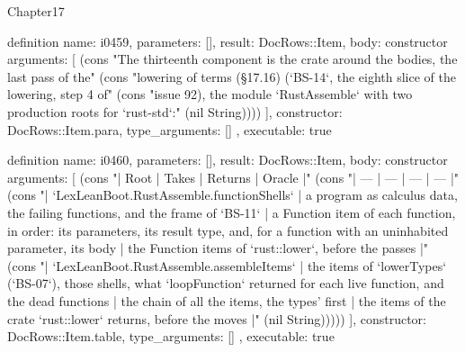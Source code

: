 \begin{lexlean}{Chapter17}
\begin{semanticmodule}
definition{
  name: i0459,
  parameters: [],
  result: DocRows::Item,
  body: constructor{
    arguments: [
      (cons "The thirteenth component is the crate around the bodies, the last pass of the" (cons "lowering of terms (§17.16) (`BS-14`, the eighth slice of the lowering, step 4 of" (cons "issue 92), the module `RustAssemble` with two production roots for `rust-std`:" (nil String))))
    ],
    constructor: DocRows::Item.para,
    type_arguments: []
  },
  executable: true
}

definition{
  name: i0460,
  parameters: [],
  result: DocRows::Item,
  body: constructor{
    arguments: [
      (cons "| Root | Takes | Returns | Oracle |" (cons "| --- | --- | --- | --- |" (cons "| `LexLeanBoot.RustAssemble.functionShells` | a program as calculus data, the failing functions, and the frame of `BS-11` | a Function item of each function, in order: its parameters, its result type, and, for a function with an uninhabited parameter, its body | the Function items of `rust::lower`, before the passes |" (cons "| `LexLeanBoot.RustAssemble.assembleItems` | the items of `lowerTypes` (`BS-07`), those shells, what `loopFunction` returned for each live function, and the dead functions | the chain of all the items, the types' first | the items of the crate `rust::lower` returns, before the moves |" (nil String)))))
    ],
    constructor: DocRows::Item.table,
    type_arguments: []
  },
  executable: true
}


\end{semanticmodule}
\end{lexlean}
